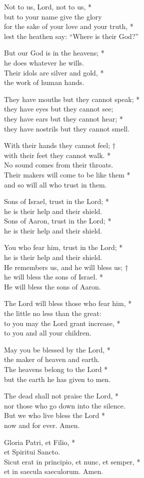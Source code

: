 Not to us, Lord, not to us, *\\
but to your name give the glory\\
for the sake of your love and your truth, *\\
lest the heathen say: “Where is their God?”

But our God is in the heavens; *\\
he does whatever he wills.\\
Their idols are silver and gold, *\\
the work of human hands.

They have mouths but they cannot speak; *\\
they have eyes but they cannot see;\\
they have ears but they cannot hear; *\\
they have nostrils but they cannot smell.

With their hands they cannot feel; †\\
with their feet they cannot walk. *\\
No sound comes from their throats.\\
Their makers will come to be like them *\\
and so will all who trust in them.

Sons of Israel, trust in the Lord; *\\
he is their help and their shield.\\
Sons of Aaron, trust in the Lord; *\\
he is their help and their shield.

You who fear him, trust in the Lord; *\\
he is their help and their shield.\\
He remembers us, and he will bless us; †\\
he will bless the sons of Israel. *\\
He will bless the sons of Aaron.

The Lord will bless those who fear him, *\\
the little no less than the great:\\
to you may the Lord grant increase, *\\
to you and all your children.

May you be blessed by the Lord, *\\
the maker of heaven and earth.\\
The heavens belong to the Lord *\\
but the earth he has given to men.

The dead shall not praise the Lord, *\\
nor those who go down into the silence.\\
But we who live bless the Lord *\\
now and for ever. Amen.

Gloria Patri, et Filio, *\\
et Spiritui Sancto. \\
Sicut erat in principio, et nunc, et semper, *\\
et in saecula saeculorum. Amen.